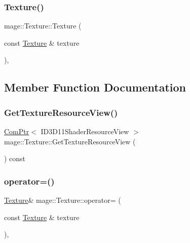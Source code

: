 \hypertarget{classmage_1_1_texture_aed9e8ab5bc3efdeb381672fd4e243ea7}{}\label{classmage_1_1_texture_aed9e8ab5bc3efdeb381672fd4e243ea7} 
\subsubsection{\texorpdfstring{Texture()}{Texture()}\hspace{0.1cm}{\footnotesize\ttfamily [2/2]}}
{\footnotesize\ttfamily mage\+::\+Texture\+::\+Texture (\begin{DoxyParamCaption}\item[{const \hyperlink{classmage_1_1_texture}{Texture} \&}]{texture }\end{DoxyParamCaption})\hspace{0.3cm}{\ttfamily [private]}, {\ttfamily [delete]}}



\subsection{Member Function Documentation}
\hypertarget{classmage_1_1_texture_a95a4969f097f2cd46ddaf973d5637fbc}{}\label{classmage_1_1_texture_a95a4969f097f2cd46ddaf973d5637fbc} 
\subsubsection{\texorpdfstring{Get\+Texture\+Resource\+View()}{GetTextureResourceView()}}
{\footnotesize\ttfamily \hyperlink{namespacemage_ae74f374780900893caa5555d1031fd79}{Com\+Ptr}$<$ I\+D3\+D11\+Shader\+Resource\+View $>$ mage\+::\+Texture\+::\+Get\+Texture\+Resource\+View (\begin{DoxyParamCaption}{ }\end{DoxyParamCaption}) const}

\hypertarget{classmage_1_1_texture_a0b73b4df98d729c8f60e58b0ca065636}{}\label{classmage_1_1_texture_a0b73b4df98d729c8f60e58b0ca065636} 
\subsubsection{\texorpdfstring{operator=()}{operator=()}}
{\footnotesize\ttfamily \hyperlink{classmage_1_1_texture}{Texture}\& mage\+::\+Texture\+::operator= (\begin{DoxyParamCaption}\item[{const \hyperlink{classmage_1_1_texture}{Texture} \&}]{texture }\end{DoxyParamCaption})\hspace{0.3cm}{\ttfamily [private]}, {\ttfamily [delete]}}



